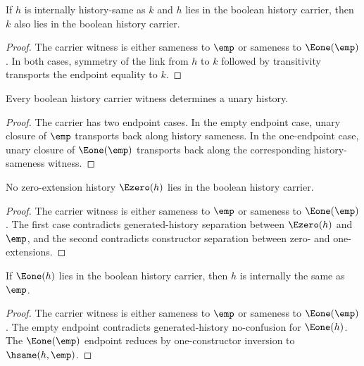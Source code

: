 \begin{theorem}
\label{thm:bool-history-carrier-hsame-transport}
If \(h\) is internally history-same as \(k\) and \(h\) lies in the boolean
history carrier, then \(k\) also lies in the boolean history carrier.
\end{theorem}
\begin{proof}
The carrier witness is either sameness to \(\emp\) or sameness to
\(\Eone(\emp)\). In both cases, symmetry of the link from \(h\) to \(k\)
followed by transitivity transports the endpoint equality to \(k\).
\end{proof}

\begin{theorem}
\label{thm:bool-history-carrier-unary}
Every boolean history carrier witness determines a unary history.
\end{theorem}
\begin{proof}
The carrier has two endpoint cases. In the empty endpoint case, unary closure
of \(\emp\) transports back along history sameness. In the one-endpoint case,
unary closure of \(\Eone(\emp)\) transports back along the corresponding
history-sameness witness.
\end{proof}

\begin{theorem}
\label{thm:bool-history-carrier-e0-absurd}
No zero-extension history \(\Ezero(h)\) lies in the boolean history carrier.
\end{theorem}
\begin{proof}
The carrier witness is either sameness to \(\emp\) or sameness to
\(\Eone(\emp)\). The first case contradicts generated-history separation
between \(\Ezero(h)\) and \(\emp\), and the second contradicts constructor
separation between zero- and one-extensions.
\end{proof}

\begin{theorem}
\label{thm:bool-history-carrier-e1-tail-empty}
If \(\Eone(h)\) lies in the boolean history carrier, then \(h\) is internally
the same as \(\emp\).
\end{theorem}
\begin{proof}
The carrier witness is either sameness to \(\emp\) or sameness to
\(\Eone(\emp)\). The empty endpoint contradicts generated-history
no-confusion for \(\Eone(h)\). The \(\Eone(\emp)\) endpoint reduces by
one-constructor inversion to \(\hsame(h,\emp)\).
\end{proof}

